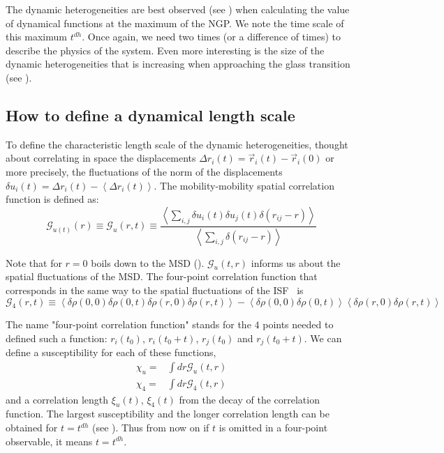 The dynamic heterogeneities are best observed (see ) when calculating the value of dynamical functions at the maximum of the \ac{NGP}. We note the time scale of this maximum $t^{dh}$. Once again, we need two times (or a difference of times) to describe the physics of the system. Even more interesting is the size of the dynamic heterogeneities that is increasing when approaching the glass transition (see ).


\subsection{How to define a dynamical length scale}
\label{sec:dyn_length}
To define the characteristic length scale of the dynamic heterogeneities, \citet{Donati1999} thought about correlating in space the displacements $\Delta r_i(t) = \vec{r}_i(t)-\vec{r}_i(0)$ or more precisely, the fluctuations of the norm of the displacements $\delta u_i(t) = \Delta r_i(t) - \left\langle \Delta r_i(t) \right\rangle$. The mobility-mobility spatial correlation function is defined as:
\begin{equation}
	\mathcal{G}_{u(t)}(r) \equiv \mathcal{G}_u(r,t) \equiv \frac{
		\left\langle \sum_{i,j}{\delta u_i(t) \delta u_j(t) \delta(r_{ij} -r)} \right\rangle 
	}{
		\left\langle \sum_{i,j}{\delta(r_{ij} -r)} \right\rangle
	}
	\label{eq:mobility_correl}
\end{equation}

Note that for $r=0$  boils down to the \ac{MSD} (). $\mathcal{G}_u(t,r)$ informs us about the spatial fluctuations of the \ac{MSD}. The four-point correlation function that corresponds in the same way to the spatial fluctuations of the \ac{ISF}~\citep{Lacevic2003} is 
\begin{equation}
	 \mathcal{G}_4(r, t) \equiv 
	 	\left\langle \delta\rho(0,0)\delta\rho(0,t) \delta\rho(r,0)\delta\rho(r,t) \right\rangle 
	 	- \left\langle \delta\rho(0,0)\delta\rho(0,t) \right\rangle 
	 		\left\langle \delta\rho(r,0)\delta\rho(r,t) \right\rangle
	 \label{eq:four_point_correl}
\end{equation}

The name "four-point correlation function" stands for the $4$ points needed to defined such a function: $r_i(t_0)$, $r_i(t_0+t)$, $r_j(t_0)$ and $r_j(t_0+t)$. We can define a susceptibility for each of these functions,
\begin{align}
	\chi_u =& \int{dr \mathcal{G}_u(t,r)} \label{eq:dynamic_susc}\\
	\chi_4 =& \int{dr \mathcal{G}_4(t,r)} \label{eq:chi4}
\end{align}
and a correlation length $\xi_u(t)$, $\xi_4(t)$ from the decay of the correlation function. The largest susceptibility and the longer correlation length can be obtained for $t=t^{dh}$ (see ). Thus from now on if $t$ is omitted in a four-point observable, it means $t=t^{dh}$.


